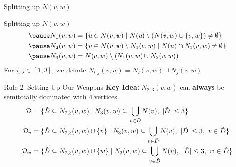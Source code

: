 \begin{frame}[c]{Splitting up $N(v,w)$}

    \begin{figure}[!ht]
    \end{figure}
\end{frame}

\begin{frame}[c]{Splitting up $N(v,w)$}
    \begin{align}
      \pause  N_1(v,w) & = \{u \in N(v,w) \mid N(u) \setminus (N(v,w)\cup \{v,w\}) \neq \emptyset \}  \\
      \pause  N_2(v,w) & = \{u \in N(v,w)\setminus N_1(v,w) \mid N(u) \cap N_1(v,w) \neq \emptyset \} \\
      \pause  N_3(v,w) & =  N(v,w) \setminus (N_1(v,w) \cup N_2(v,w))
    \end{align}
    For $i,j \in [1,3]$, we denote $N_{i,j}(v,w) = N_i(v,w) \cup N_j(v,w)$.
\end{frame}


\begin{frame}[c]{Rule 2: Setting Up Our Weapons}
    \textbf{Key Idea: } $N_{2,3}(v, w)$ can \textbf{always} be semitotally dominated with 4 vertices.
    \pause\begin{align}
        \mathcal{D} & = \{ \tilde D \subseteq N_{2,3}(v,w)            \mid N_3(v,w) \subseteq \bigcup_{v \in \tilde D} N(v),\ |\tilde D| \leq 3                  \} \\
        \mathcal{D}_{v}  & = \{ \tilde D \subseteq N_{2,3}(v,w) \cup \{v\} \mid N_3(v,w) \subseteq \bigcup_{v \in \tilde D} N(v),\ |\tilde D| \leq 3,\ v \in \tilde D \} \\
        \mathcal{D}_{w}  & = \{ \tilde D \subseteq N_{2,3}(v,w) \cup \{w\} \mid N_3(v,w) \subseteq \bigcup_{v \in \tilde D} N(v),\ |\tilde D| \leq 3,\ w \in \tilde D \}
    \end{align}

\end{frame}


